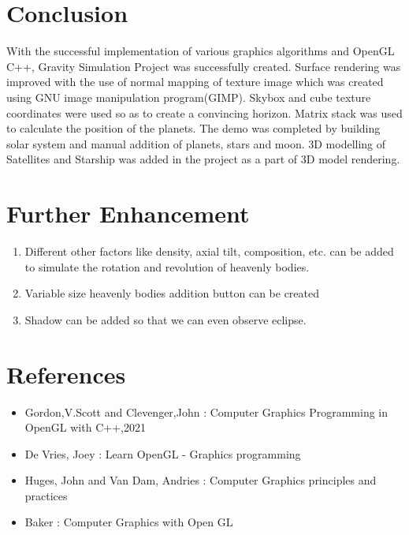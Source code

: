 \documentclass[12pt]{article}
\begin{document}
\clearpage
\section{Conclusion}
With the successful implementation of various graphics algorithms and OpenGL C++, Gravity Simulation Project was successfully created. Surface rendering was improved with the use of normal mapping of texture image which was created using GNU image manipulation program(GIMP). Skybox and cube texture coordinates were used so as to create a convincing horizon. Matrix stack was used to calculate the position of the planets. The demo was completed by building solar system and manual addition of planets, stars and moon. 3D modelling of Satellites and Starship was added in the project as a part of 3D model rendering.

\section{Further Enhancement}
\begin{enumerate}
	\item Different other factors like density, axial tilt, composition, etc.  can be added to simulate the rotation and revolution of heavenly bodies. 
	\item Variable size heavenly bodies addition button can be created
	\item Shadow can be added so that we can even observe eclipse.
\end{enumerate}

\section{References}
\begin{itemize}
	\item Gordon,V.Scott and Clevenger,John : Computer Graphics Programming in OpenGL with C++,2021
	\item De Vries, Joey : Learn OpenGL - Graphics programming
	\item Huges, John and Van Dam, Andries : Computer Graphics principles and practices
	\item Baker : Computer Graphics with Open GL
\end{itemize}
\end{document}
